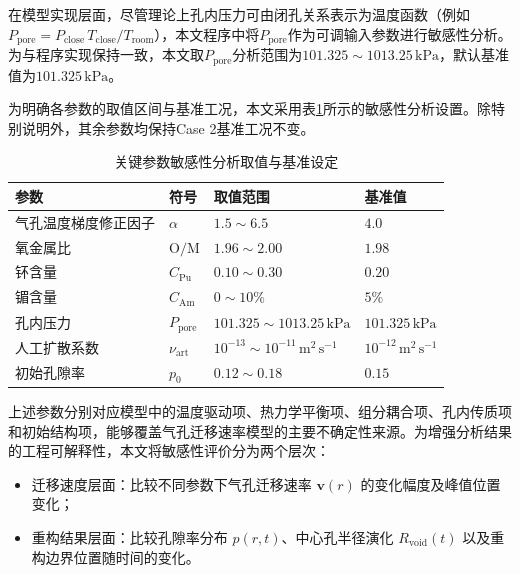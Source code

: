 在模型实现层面，尽管理论上孔内压力可由闭孔关系表示为温度函数（例如 $P_{\mathrm{pore}}=P_{\mathrm{close}}\,T_{\mathrm{close}}/T_{\mathrm{room}}$），本文程序中将$P_{\mathrm{pore}}$作为可调输入参数进行敏感性分析。为与程序实现保持一致，本文取$P_{\mathrm{pore}}$分析范围为$101.325\sim1013.25\,\mathrm{kPa}$，默认基准值为$101.325\,\mathrm{kPa}$。

为明确各参数的取值区间与基准工况，本文采用表\ref{tab:sensitivity_parameters}所示的敏感性分析设置。除特别说明外，其余参数均保持Case 2基准工况不变。

\begin{table}[htbp]
	\centering
	\caption{关键参数敏感性分析取值与基准设定}
	\label{tab:sensitivity_parameters}
	\begin{tabularx}{\textwidth}{@{}
			>{\centering\arraybackslash}X
			>{\centering\arraybackslash}m{3.8cm}
			>{\centering\arraybackslash}m{3.8cm}
			>{\centering\arraybackslash}m{3cm}
			@{}}
		\toprule
		参数 & 符号 & 取值范围 & 基准值 \\
		\midrule
		气孔温度梯度修正因子 & $\alpha$ & $1.5\sim6.5$ & $4.0$ \\
		氧金属比 & $\mathrm{O/M}$ & $1.96\sim2.00$ & $1.98$ \\
		钚含量 & $C_{\mathrm{Pu}}$ & $0.10\sim0.30$ & $0.20$ \\
		镅含量 & $C_{\mathrm{Am}}$ & $0\sim10\%$ & $5\%$ \\
		孔内压力 & $P_{\mathrm{pore}}$ & $101.325\sim1013.25\,\mathrm{kPa}$ & $101.325\,\mathrm{kPa}$ \\
		人工扩散系数 & $\nu_{\mathrm{art}}$ & $10^{-13}\sim10^{-11}\,\mathrm{m^2\,s^{-1}}$ & $10^{-12}\,\mathrm{m^2\,s^{-1}}$ \\
		初始孔隙率 & $p_0$ & $0.12\sim0.18$ & $0.15$ \\
		\bottomrule
	\end{tabularx}
\end{table}

上述参数分别对应模型中的温度驱动项、热力学平衡项、组分耦合项、孔内传质项和初始结构项，能够覆盖气孔迁移速率模型的主要不确定性来源。为增强分析结果的工程可解释性，本文将敏感性评价分为两个层次：
\begin{itemize}
	\item 迁移速度层面：比较不同参数下气孔迁移速率 $\boldsymbol{v}(r)$ 的变化幅度及峰值位置变化；
	\item 重构结果层面：比较孔隙率分布 $p(r,t)$、中心孔半径演化 $R_{\mathrm{void}}(t)$ 以及重构边界位置随时间的变化。
\end{itemize}

